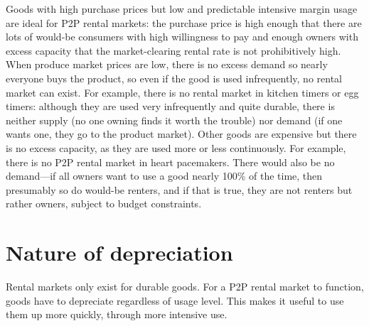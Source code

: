\documentclass[11pt]{article}
\begin{document}
Goods with high purchase prices but low and predictable intensive margin usage are ideal for P2P rental markets: 
the purchase price is high enough that there are lots of would-be consumers with high willingness to pay and enough owners with excess capacity that the market-clearing rental rate is not prohibitively high. 
When produce market prices are low, there is no excess demand so nearly everyone buys the product, so even if the good is used infrequently, no rental market can exist.  
For example, there is no rental market in kitchen timers or egg timers: although they are used very infrequently and quite durable, there is neither supply (no one owning finds it worth the trouble) nor demand (if one wants one, they go to the product market). 
Other goods are expensive but there is no excess capacity, as they are used more or less continuously. 
For example, there is no P2P rental market in heart pacemakers. 
There would also be no demand---if all owners want to use a good nearly 100\% of the time, then presumably so do would-be renters, and if that is true, they are not renters but rather owners, subject to budget constraints.   

\section{Nature of depreciation} 
Rental markets only exist for durable goods. 
For a P2P rental market to function, goods have to depreciate regardless of usage level. 
This makes it useful to use them up more quickly, through more intensive use. 
\end{document}
